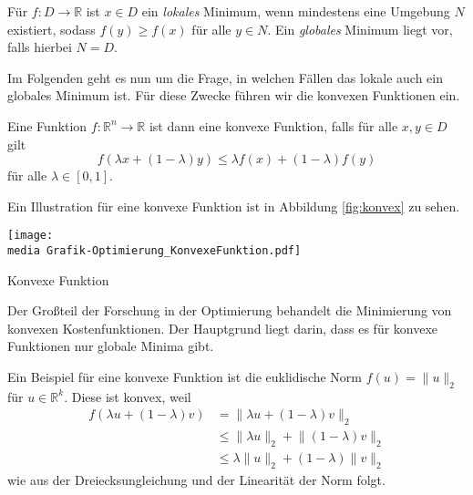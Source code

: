 \begin{Def}
Für $f: D\rightarrow \mathbb{R}$ ist $x\in D$ ein \emph{lokales} Minimum, wenn mindestens eine Umgebung $N$ existiert, sodass $f(y)\geq f(x)$ für alle $y\in N$.
Ein \emph{globales} Minimum liegt vor, falls hierbei $N=D$.
\end{Def}

Im Folgenden geht es nun um die Frage, in welchen F\"allen das lokale auch ein globales Minimum ist. F\"ur diese Zwecke f\"uhren wir die konvexen Funktionen ein.

\begin{Def}
Eine Funktion $f: \mathbb{R}^n\rightarrow\mathbb{R}$ ist dann eine konvexe Funktion, falls für alle $x, y\in D$ gilt
\begin{equation*}
  f(\lambda x+ (1 - \lambda)y) \leq \lambda f(x)+(1-\lambda)f(y)
\end{equation*}
für alle $\lambda \in [0, 1]$.
\end{Def}

Ein Illustration f\"ur eine konvexe Funktion ist in Abbildung \ref{fig:konvex} zu sehen. 
 \begin{dsafigure}
 \begin{center}
 \texttt{[image: \\media Grafik-Optimierung\_KonvexeFunktion.pdf]}
 \caption{Konvexe Funktion}
 \label{fig:konvex}
 \end{center}
\end{dsafigure}
Der Gro\ss teil der Forschung in der Optimierung behandelt die Minimierung von konvexen Kostenfunktionen. Der Hauptgrund liegt darin, dass es f\"ur konvexe Funktionen nur globale Minima gibt. 


\begin{Bsp}
Ein Beispiel für eine konvexe Funktion ist die euklidische Norm $f(u) = \lVert u\rVert_2$ für $u\in\mathbb{R}^k$. Diese ist konvex, weil
\begin{align*}
f(\lambda u+(1-\lambda)v) &=\lVert\lambda u+(1-\lambda)v\rVert_2\\
&\leq\lVert\lambda u\rVert_2+\lVert(1-\lambda)v\rVert_2\\
&\leq\lambda\lVert u\rVert_2+(1-\lambda)\lVert v\rVert_2
\end{align*}
wie aus der Dreiecksungleichung und der Linearität der Norm folgt.
\end{Bsp}
